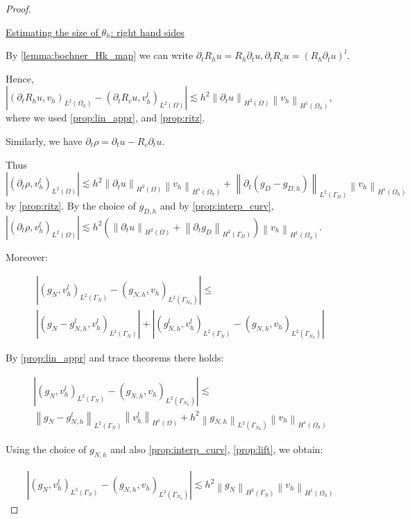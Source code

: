 \documentclass[english,a4paper,9pt,oneside]{scrbook}	%
\theoremstyle{break}
\newenvironment{mproof}[1][\proofname]{%
  \begin{proof}[#1]$ $\par\nobreak\ignorespaces
}{%
  \end{proof}
}
\renewcommand*{\proofname}{Proof}
\theoremstyle{remark}
\newcommand{\norm}[1]{\left\lVert#1\right\rVert}
\begin{document}
\begin{appendices}
\begin{mproof}
\underline{Estimating the size of $\theta_h$: right hand sides}

By \cref{lemma:bochner_Hk_map} we can write $\partial_t R_h u = R_h \partial_t u, \partial_t R_c u = (R_h \partial_t u)^l$.

Hence, $|(\partial_t R_h u , v_h)_{L^2(\Omega_h)} - (\partial_t R_c u , v_h^l)_{L^2(\Omega)}|\lesssim h^2 \norm{\partial_t u}_{H^2(\Omega)}\norm{v_h}_{H^1(\Omega_h)}$, where we used \cref{prop:lin_appr}, and \cref{prop:ritz}.

Similarly, we have $\partial_t \rho = \partial_t u - R_c\partial_t u$.

Thus $| (\partial_t \rho, v_h^l)_{L^2(\Omega)}|\lesssim h^2 \norm{\partial_t u}_{H^2(\Omega)}\norm{v_h}_{H^1(\Omega_h)} + \norm{\partial_t(g_D - g_{D,h}) }_{L^2(\Gamma_D)}\norm{v_h}_{H^1(\Omega_h)}$ by \cref{prop:ritz}. By the choice of $g_{D,h}$ and by \cref{prop:interp_curv}, $| (\partial_t \rho, v_h^l)_{L^2(\Omega)}|\lesssim h^2 (\norm{\partial_t u}_{H^2(\Omega)} + \norm{\partial_t g_D}_{H^2(\Gamma_D)})\norm{v_h}_{H^1(\Omega_h)}$.

Moreover:

\begin{align*}
	|(g_{N}, v_h^l)_{L^2(\Gamma_{N})} - (g_{N,h}, v_h)_{L^2(\Gamma_{N_h})} |\leq\\
	|(g_{N} - g_{N,h}^l, v_h^l)_{L^2(\Gamma_{N})}| + |(g_{N,h}^l, v_h^l)_{L^2(\Gamma_{N})} - (g_{N,h}, v_h)_{L^2(\Gamma_{N_h})} |
\end{align*}

By \cref{prop:lin_appr} and trace theorems there holds:


\begin{align*}
	|(g_{N}, v_h^l)_{L^2(\Gamma_{N})} - (g_{N,h}, v_h)_{L^2(\Gamma_{N_h})} |\lesssim\\
	\norm{g_{N} - g_{N,h}^l}_{L^2(\Gamma_{N})}\norm{v_h^l}_{H^1(\Omega)} + h^2\norm{g_{N,h}}_{L^2(\Gamma_{N_h})} \norm{v_h}_{H^1(\Omega_h )}
\end{align*}

Using the choice of $g_{N,h}$ and also \cref{prop:interp_curv}, \cref{prop:lift}, we obtain:

\begin{align*}
	|(g_{N}, v_h^l)_{L^2(\Gamma_{N})} - (g_{N,h}, v_h)_{L^2(\Gamma_{N_h})} |\lesssim 	h^2 \norm{g_N}_{H^2(\Gamma_N)}\norm{v_h}_{H^1(\Omega_h)}
\end{align*}


\end{mproof}
\end{appendices}
\end{document}
